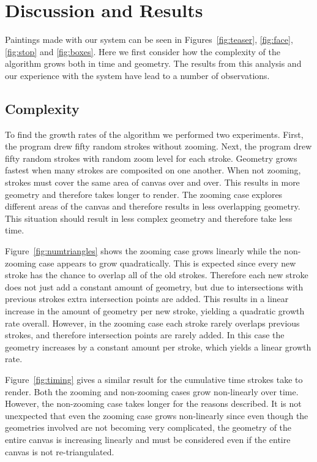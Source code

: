 \documentclass[review,draft]{acmsiggraph}
\begin{document}
\section{Discussion and Results}
Paintings made with our system can be seen in Figures~\ref{fig:teaser}, \ref{fig:face},  \ref{fig:stop} and \ref{fig:boxes}.  Here we first consider how the complexity of the algorithm grows both in time and geometry.
The results from this analysis and our experience with the system have lead to a number of observations.

\subsection{Complexity}
To find the growth rates of the algorithm we performed two experiments. 
First, the program drew fifty random strokes without zooming.
Next, the program drew fifty random strokes with random zoom level for each stroke.
Geometry grows fastest when many strokes are composited on one another. When not zooming, strokes
must cover the same area of canvas over and over. This
results in more geometry and therefore takes longer to render. The zooming case explores different
areas of the canvas and therefore results in less overlapping geometry. This situation should result
in less complex geometry and therefore take less time.

Figure~\ref{fig:numtriangles} shows the zooming case grows linearly while the non-zooming case
appears to grow quadratically. This is expected since every new stroke has the chance to overlap
all of the old strokes. Therefore each new stroke does not just add a constant amount of geometry, but 
due to intersections with previous strokes extra intersection points are added. This results in a linear
increase in the amount of geometry per new stroke, yielding a quadratic growth rate overall. 
However, in the zooming case each stroke rarely overlaps previous strokes, and therefore
intersection points are rarely added. In this case the geometry increases by a constant amount per stroke, which yields a linear growth rate.

Figure~\ref{fig:timing} gives a similar result for the cumulative time strokes take to render. Both
the zooming and non-zooming cases grow non-linearly over time. However, the non-zooming case takes
longer for the reasons described. It is not unexpected that even the zooming case grows non-linearly
since even though the geometries involved are not becoming very complicated, the geometry of the entire
canvas is increasing linearly and must be considered even if the entire canvas is not re-triangulated.
\end{document}
